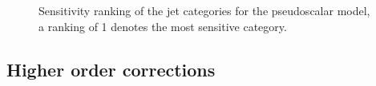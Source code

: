 \begin{figure}[h!] \centering
  \caption{Sensitivity ranking of the jet categories for the pseudoscalar model, a ranking of 1 denotes the most sensitive category. }
  \label{fig:sensitivityPS} 
\end{figure}

\subsection{Higher order corrections}

